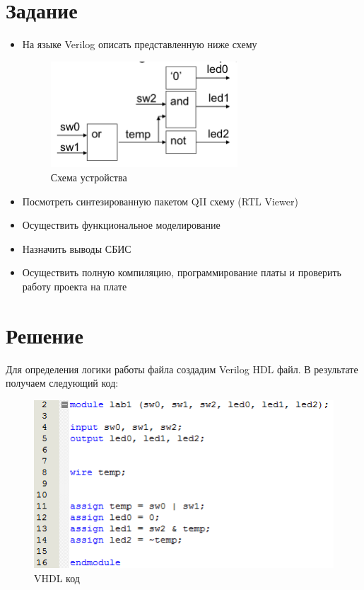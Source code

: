 \documentclass[utf8x, 12pt]{G7-32}
\begin{document}
\frontmatter 

\thispagestyle{empty}
\setcounter{page}{0}
\tableofcontents
\clearpage
\mainmatter



\chapter{Задание}

\begin{itemize}
	\item На языке Verilog описать представленную ниже схему
	
\begin{figure}[h]
	\begin{center}
		\includegraphics[width=7cm]{img/shema}
	\end{center}
	\vspace{-5mm}\caption{Схема устройства}
\end{figure}	
	
	\item Посмотреть синтезированную пакетом QII схему (RTL Viewer)
	\item Осуществить функциональное моделирование 
	\item Назначить выводы СБИС
	\item Осуществить полную компиляцию, программирование платы и проверить работу проекта на плате 
\end{itemize}

\chapter{Решение}

Для определения логики работы файла создадим Verilog HDL файл. В результате получаем следующий код:

\begin{figure}[hhh!]
	\begin{center}
		\includegraphics[width=12cm]{img/vhdl}
	\end{center}
	\vspace{-5mm}\caption{VHDL код}
\end{figure}
\end{document}
